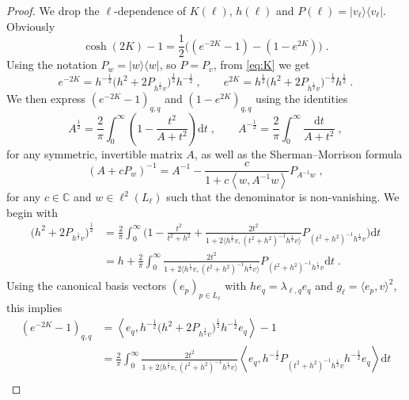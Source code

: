 \documentclass[12pt,a4paper]{article}
\numberwithin{equation}{section}
\newcommand{\1}{\mathbb{I}}
\newcommand{\C}{\mathbb{C}}
\newcommand{\half}{\frac{1}{2}}
\newcommand{\eva}[1]{\left\langle #1 \right\rangle}
\theoremstyle{plain}
\theoremstyle{definition}
\theoremstyle{remark}
\theoremstyle{plain}
\theoremstyle{definition}
\theoremstyle{remark}
\begin{document}
\begin{proof}
We drop the $ \ell $-dependence of $K(\ell) $, $ h(\ell) $ and $ P(\ell) = |v_\ell \rangle \langle v_\ell| $. Obviously
\begin{equation} \label{eq:coshrewriting}
	\cosh(2K)-1
	= \half\big((e^{-2K}-1)-(1-e^{2K})\big) \;.
\end{equation}
Using the notation $ P_w = |w \rangle \langle w| $, so $ P = P_v $, from \eqref{eq:K} we get
\begin{equation} \label{eq:e-2k}
	e^{-2K} = h^{-\half} \big(h^2 +2P_{h^{\half} v}\big)^{\half} h^{-\half} \;, \qquad
	e^{2K} = h^{\half} \big(h^2 +2P_{h^{\half} v}\big)^{-\half} h^{\half} \;.
\end{equation}
We then express $ (e^{-2K}-1)_{q,q} $ and $ (1-e^{2K})_{q,q} $ using the identities
\begin{equation} \label{eq:intid}
	A^\half = \frac{2}{\pi} \int_0^\infty \left(1- \frac{t^2}{A+t^2}\right) \mathrm{d}t \;,\qquad
	A^{-\half} = \frac{2}{\pi} \int_0^\infty \frac{\mathrm{d}t}{A+t^2} \;,
\end{equation}
for any symmetric, invertible matrix $ A $, as well as the Sherman--Morrison formula
\begin{equation} \label{eq:shermor}
	(A+cP_w)^{-1} = A^{-1} - \frac{c}{1+c\eva{w, A^{-1}w}}P_{A^{-1}w} \;,
\end{equation}
for any $ c \in \C $ and $ w \in \ell^2(L_\ell) $ such that the denominator is non-vanishing. We begin with
\begin{align}
	\big(h^2 +2P_{h^{\half} v}\big)^{\half}
	&= \frac{2}{\pi} \int_0^\infty \Bigg( 1- \frac{t^2}{t^2+h^2} + \frac{2 t^2}{1+ 2 \big\langle h^{\half} v ,(t^2+h^2)^{-1} h^\half v \big\rangle } P_{(t^2+h^2)^{-1}h^{\half} v} \Bigg) \mathrm{d}t \nonumber\\
	&= h + \frac{2}{\pi} \int_0^\infty \frac{2t^2}{1+ 2 \big\langle h^{\half} v ,(t^2+h^2)^{-1} h^\half v \big\rangle }  P_{(t^2+h^2)^{-1}h^{\half} v}\mathrm{d}t \;.
\end{align}
Using the canonical basis vectors $ (e_p)_{p \in L_\ell} $ with $ h e_q = \lambda_{\ell,q} e_q $ and $ g_\ell = \langle e_p,v \rangle^2 $, this implies
\begin{align}
	(e^{-2K}-1)_{q,q}
	&= \eva{e_q, h^{-\half} \big(h^2 +2P_{h^{\half} v}\big)^{\half} h^{-\half} e_q} - 1\nonumber\\
	&= \frac{2}{\pi} \int_0^\infty \frac{2t^2}{1+ 2 \big\langle h^{\half} v ,(t^2+h^2)^{-1} h^\half v \big\rangle } \eva{e_q,h^{-\half} P_{(t^2+h^2)^{-1}h^{\half} v}h^{-\half} e_q}\mathrm{d}t\nonumber\\

\end{align}
\end{proof}
\end{document}
